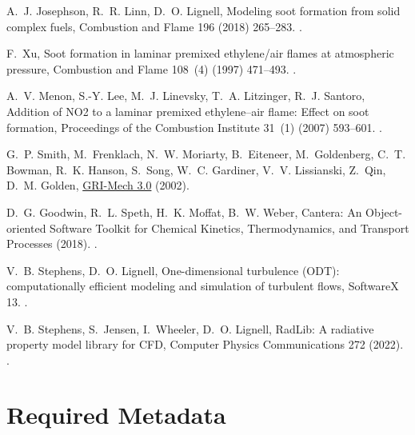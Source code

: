 \documentclass[preprint,letterpaper]{elsarticle}
\begin{document}
\begin{thebibliography}{00}
A.~J. Josephson, R.~R. Linn, D.~O. Lignell, {Modeling soot formation from solid
complex fuels}, {Combustion and Flame} 196 (2018) 265--283.
\newblock \href {http://dx.doi.org/10.1016/j.combustflame.2018.06.020}
  {}.

F.~Xu, {Soot formation in laminar premixed ethylene/air flames at atmospheric
pressure}, {Combustion and Flame} 108~(4) (1997) 471--493.
\newblock \href {http://dx.doi.org/10.1016/S0010-2180(96)00200-3}
  {}.

A.~V. Menon, S.-Y. Lee, M.~J. Linevsky, T.~A. Litzinger, R.~J. Santoro,
{Addition of NO2 to a laminar premixed ethylene--air flame: Effect on soot
formation}, {Proceedings of the Combustion Institute} 31~(1) (2007) 593--601.
\newblock \href {http://dx.doi.org/10.1016/j.proci.2006.08.105}
  {}.

G.~P. Smith, M.~Frenklach, N.~W. Moriarty, B.~Eiteneer, M.~Goldenberg, C.~T.
Bowman, R.~K. Hanson, S.~Song, W.~C. Gardiner, V.~V. Lissianski, Z.~Qin,
D.~M. Golden, \href{http://combustion.berkeley.edu/gri-mech/}{{GRI-Mech 3.0}}
(2002).

D.~G. Goodwin, R.~L. Speth, H.~K. Moffat, B.~W. Weber, {Cantera: An
Object-oriented Software Toolkit for Chemical Kinetics, Thermodynamics, and
Transport Processes} (2018).
\newblock \href {http://dx.doi.org/10.5281/zenodo.1174508}
  {}.

V.~B. Stephens, D.~O. Lignell, {One-dimensional turbulence ({ODT}):
computationally efficient modeling and simulation of turbulent flows},
{SoftwareX} 13.
\newblock \href {http://dx.doi.org/10.1016/j.softx.2020.100641}
  {}.

V.~B. Stephens, S.~Jensen, I.~Wheeler, D.~O. Lignell, {RadLib: A radiative
property model library for CFD}, {Computer Physics Communications} 272 (2022).
\newblock \href {http://dx.doi.org/10.1016/j.cpc.2021.108227}
  {}.

\end{thebibliography}


\section*{Required Metadata}
\end{document}
